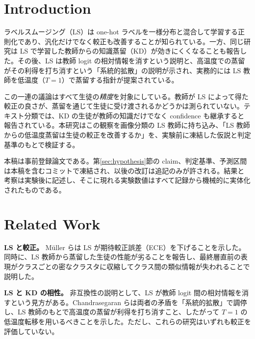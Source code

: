 \documentclass[journal,article,submit,moreauthors]{Definitions/mdpi}
\begin{document}
\section{Introduction}

ラベルスムージング（LS）は one-hot ラベルを一様分布と混合して学習する正則化であり、汎化だけでなく較正も改善することが知られている\cite[s1.p1]{muller-2019-when}。一方、同じ研究は LS で学習した教師からの知識蒸留（KD）が効きにくくなることも報告した\cite[s1.p2]{muller-2019-when}。その後、LS は教師 logit の相対情報を消すという説明\cite[s2.p1]{shen-2021-label}と、高温度での蒸留がその利得を打ち消すという「系統的拡散」の説明\cite[s3.p1]{chandrasegaran-2022-revisiting}が示され、実務的には LS 教師を低温度（$T=1$）で蒸留する指針が提案されている\cite[s3.p2]{chandrasegaran-2022-revisiting}。

この一連の議論はすべて生徒の\emph{精度}を対象にしている。教師が LS によって得た較正の良さが、蒸留を通じて生徒に受け渡されるかどうかは測られていない。テキスト分類では、KD の生徒が教師の知識だけでなく confidence も継承すると報告されている\cite[s4.p1]{sultan-2023-knowledge}。本研究はこの観察を画像分類の LS 教師に持ち込み、「LS 教師からの低温度蒸留は生徒の較正を改善するか」を、実験前に凍結した仮説と判定基準のもとで検証する。

本稿は事前登録論文である。第\ref{sec:hypothesis}節の claim、判定基準、予測区間は本稿を含むコミットで凍結され、以後の改訂は追記のみが許される。結果と考察は実験後に記述し、そこに現れる実験数値はすべて記録から機械的に実体化されたものである。

\section{Related Work}

\textbf{LS と較正。} Müller らは LS が期待較正誤差（ECE）を下げることを示した\cite[s1.p1]{muller-2019-when}。同時に、LS 教師から蒸留した生徒の性能が劣ることを報告し、最終層直前の表現がクラスごとの密なクラスタに収縮してクラス間の類似情報が失われることで説明した\cite[s1.p2]{muller-2019-when}。

\textbf{LS と KD の相性。} 非互換性の説明として、LS が教師 logit 間の相対情報を消すという見方がある\cite[s2.p1]{shen-2021-label}。Chandrasegaran らは両者の矛盾を「系統的拡散」で調停し、LS 教師のもとで高温度の蒸留が利得を打ち消すこと\cite[s3.p1]{chandrasegaran-2022-revisiting}、したがって $T=1$ の低温度転移を用いるべきこと\cite[s3.p2]{chandrasegaran-2022-revisiting}を示した。ただし、これらの研究はいずれも較正を評価していない。
\end{document}
